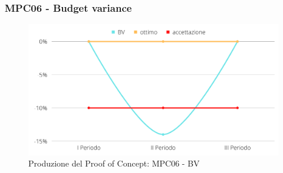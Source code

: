 \subsubsection{MPC06 - Budget variance}
\begin{figure}[H]
    \centering
    \includegraphics[scale=0.50]{Sezioni/images/poc-BV.png}
    \caption{Produzione del Proof of Concept: MPC06 - BV}
\end{figure}

